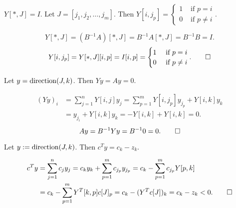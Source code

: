 \begin{lemma}
\label{thm:YJ-is-I}
$Y[*, J] = I$.
Let $J = [j_1, j_2, \ldots, j_m]$.
Then $Y[i, j_p] = \begin{cases}1 & \textrm{ if } p = i
\\ 0 & \textrm{ if } p \neq i\end{cases}$.
\end{lemma}
\begin{longProof}
\[ Y[*, J] = (B^{-1}A)[*, J] = B^{-1}A[*, J] = B^{-1}B = I. \]
\[ Y[i, j_p] = Y[*, J][i, p] = I[i, p] = \begin{cases}1 & \textrm{ if } p = i
\\ 0 & \textrm{ if } p \neq i\end{cases}. \qedhere \]
\end{longProof}

\begin{lemma}
\label{thm:y-in-nullsp}
Let $y = \operatorname{direction}(J, k)$. Then $Yy = Ay = 0$.
\end{lemma}
\begin{longProof}
\begin{align*}
(Yy)_i &= \sum_{j=1}^n Y[i, j]y_j
= \sum_{p=1}^m Y[i, j_p]y_{j_p} + Y[i, k]y_k
\\ &= y_{j_i} + Y[i, k]y_k
= -Y[i, k] + Y[i, k] = 0.
\end{align*}
\[ Ay = B^{-1}Yy = B^{-1}0 = 0. \qedhere \]
\end{longProof}

\begin{lemma}
\label{thm:y-reduces-cost}
Let $y := \operatorname{direction}(J, k)$. Then $c^Ty = c_k - z_k$.
\end{lemma}
\begin{longProof}
\begin{align*}
c^Ty &= \sum_{j=1}^n c_jy_j = c_ky_k + \sum_{p=1}^m c_{j_p}y_{j_p}
= c_k - \sum_{p=1}^m c_{j_p}Y[p, k]
\\ &= c_k - \sum_{p=1}^m Y^T[k, p]c[J]_p
= c_k - (Y^Tc[J])_k = c_k - z_k < 0.
\qedhere \end{align*}
\end{longProof}

